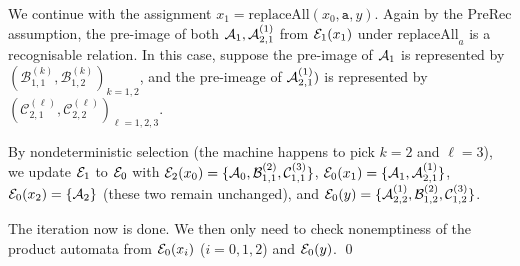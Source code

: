 \begin{example}
		We continue with the assignment $x_1 = \text{replaceAll}(x_0,\texttt{a},y)$. Again by the PreRec assumption, the pre-image of both $\mathcal{A}_1,\mathcal{A}^{(1)}_{2,1}$ from $\mathcal{E}_1(x_1)$ under  $\text{replaceAll}_a$ is a recognisable relation. In this case, suppose 
		the pre-image of $\mathcal{A}_1$ is represented by $(\mathcal{B}^{(k)}_{1, 1}, \mathcal{B}^{(k)}_{1, 2})_{k = 1,2}$, and the pre-imeage of $\mathcal{A}^{(1)}_{2,1})$ is represented by $( \mathcal{C}^{(\ell)}_{2, 1}, \mathcal{C}^{(\ell)}_{2, 2})_{ \ell=1,2,3}$. 
		
		
		By nondeterministic selection (the machine happens to pick $k=2$ and $\ell=3$), we update $\mathcal{E}_1$ to $\mathcal{E}_0$ with $\mathcal{E}_2(x_0)=\{\mathcal{A}_0, \mathcal{B}^{(2)}_{1,1}, \mathcal{C}^{(3)}_{1,1}\}$, $\mathcal{E}_0(x_1)=\{\mathcal{A}_1,\mathcal{A}^{(1)}_{2,1}\}$, $\mathcal{E}_0(x_2)=\{\mathcal{A}_2\}$ (these two remain unchanged), and $\mathcal{E}_0(y)=\{\mathcal{A}^{(1)}_{2,2}, \mathcal{B}^{(2)}_{1,2},  \mathcal{C}^{(3)}_{1,2}\}$.
		
		The iteration now is done. We then only need to check nonemptiness of the product automata from $\mathcal{E}_0(x_i)$ ($i=0,1,2$) and $\mathcal{E}_0(y)$. \qed
\end{example}

